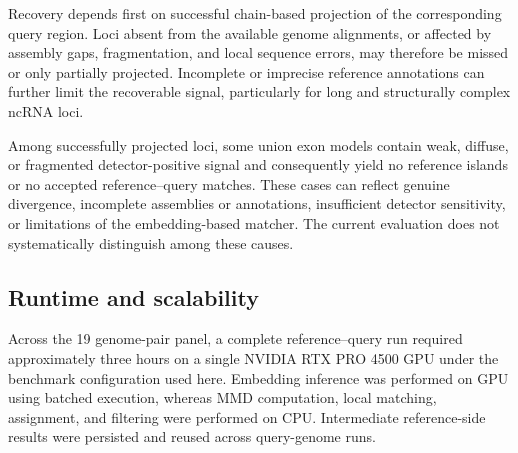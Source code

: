 Recovery depends first on successful chain-based projection of the corresponding
query region. Loci absent from the available genome alignments, or affected by
assembly gaps, fragmentation, and local sequence errors, may therefore be missed
or only partially projected. Incomplete or imprecise reference annotations can
further limit the recoverable signal, particularly for long and structurally
complex ncRNA loci.

Among successfully projected loci, some union exon models contain weak, diffuse,
or fragmented detector-positive signal and consequently yield no reference
islands or no accepted reference--query matches. These cases can reflect genuine
divergence, incomplete assemblies or annotations, insufficient detector
sensitivity, or limitations of the embedding-based matcher. The current
evaluation does not systematically distinguish among these causes.

\subsection{Runtime and scalability}

Across the 19 genome-pair panel, a complete reference--query run required
approximately three hours on a single NVIDIA RTX PRO 4500 GPU under the benchmark
configuration used here. Embedding inference was performed on GPU using batched
execution, whereas MMD computation, local matching, assignment, and filtering
were performed on CPU.
Intermediate reference-side results were persisted and reused across
query-genome runs.

